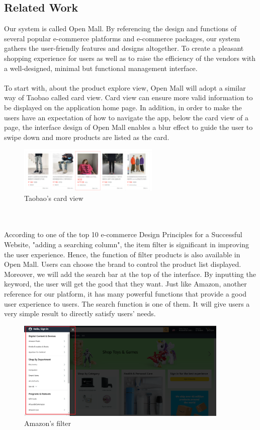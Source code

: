 \documentclass{article}
\begin{document}
\subsection{Related Work}
Our system is called Open Mall. By referencing the design and functions of several popular e-commerce platforms and e-commerce packages, our system gathers the user-friendly features and designs altogether. To create a pleasant shopping experience for users as well as to raise the efficiency of the vendors with a well-designed, minimal but functional management interface.
\\\\
To start with, about the product explore view, Open Mall will adopt a similar way of Taobao called card view. Card view can ensure more valid information to be displayed on the application home page\cite{upx}. In addition, in order to make the users have an expectation of how to navigate the app, below the card view of a page, the interface design of Open Mall enables a blur effect to guide the user to swipe down and more products are listed as the card.
\begin{figure}[!htp]
    \centering
    \includegraphics[width=0.6\textwidth]{card view.png}
    \caption{\label{fig:card view}Taobao's card view}
\end{figure}
\\\\
According to one of the top 10 e-commerce Design Principles for a Successful Website\cite{t10p}, "adding a searching column", the item filter is significant in improving the user experience. Hence, the function of filter products is also available in Open Mall. Users can choose the brand to control the product list displayed. Moreover, we will add the search bar at the top of the interface. By inputting the keyword, the user will get the good that they want. Just like Amazon, another reference for our platform, it has many powerful functions that provide a good user experience to users. The search function is one of them. It will give users a very simple result to directly satisfy users' needs.
\begin{figure}[!htp]
    \centering
    \includegraphics[width=0.9\textwidth]{Amazon filter.png}
    \caption{\label{fig:card view}Amazon's filter}
\end{figure} 
\end{document}
